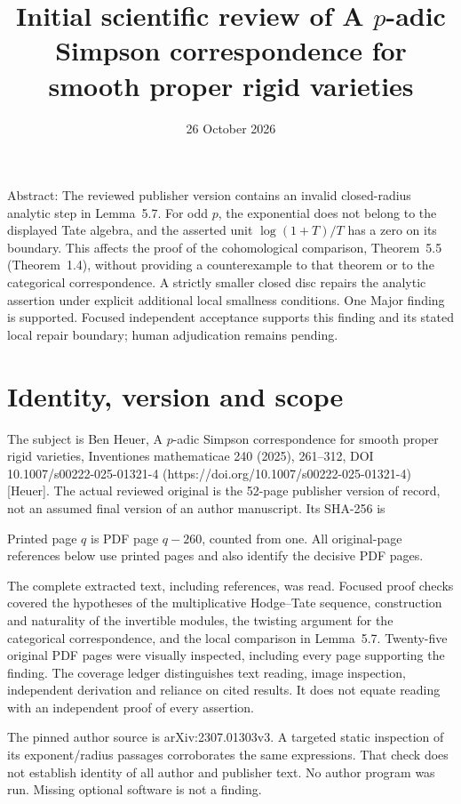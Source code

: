 \documentclass[10pt]{article}
\title{Initial scientific review of
A \(p\)-adic Simpson correspondence for smooth proper rigid varieties}
\author{}
\date{26 October 2026}
\begin{document}
\maketitle
Abstract: The reviewed publisher version contains an invalid closed-radius analytic step in Lemma 5.7. For odd \(p\), the exponential does not belong to the displayed Tate algebra, and the asserted unit \(\log(1+T)/T\) has a zero on its boundary. This affects the proof of the cohomological comparison, Theorem 5.5 (Theorem 1.4), without providing a counterexample to that theorem or to the categorical correspondence. A strictly smaller closed disc repairs the analytic assertion under explicit additional local smallness conditions. One Major finding is supported. Focused independent acceptance supports this finding and its stated local repair boundary; human adjudication remains pending.\par
\section*{Identity, version and scope}
The subject is Ben Heuer, A \(p\)-adic Simpson correspondence for smooth proper rigid varieties, Inventiones mathematicae 240 (2025), 261–312, DOI 10.1007/s00222-025-01321-4 (https://doi.org/10.1007/s00222-025-01321-4) [Heuer]. The actual reviewed original is the 52-page publisher version of record, not an assumed final version of an author manuscript. Its SHA-256 is\par
Printed page \(q\) is PDF page \(q-260\), counted from one. All original-page references below use printed pages and also identify the decisive PDF pages.\par
The complete extracted text, including references, was read. Focused proof checks covered the hypotheses of the multiplicative Hodge–Tate sequence, construction and naturality of the invertible modules, the twisting argument for the categorical correspondence, and the local comparison in Lemma 5.7. Twenty-five original PDF pages were visually inspected, including every page supporting the finding. The coverage ledger distinguishes text reading, image inspection, independent derivation and reliance on cited results. It does not equate reading with an independent proof of every assertion.\par
The pinned author source is arXiv:2307.01303v3. A targeted static inspection of its exponent/radius passages corroborates the same expressions. That check does not establish identity of all author and publisher text. No author program was run. Missing optional software is not a finding.\par
\end{document}
